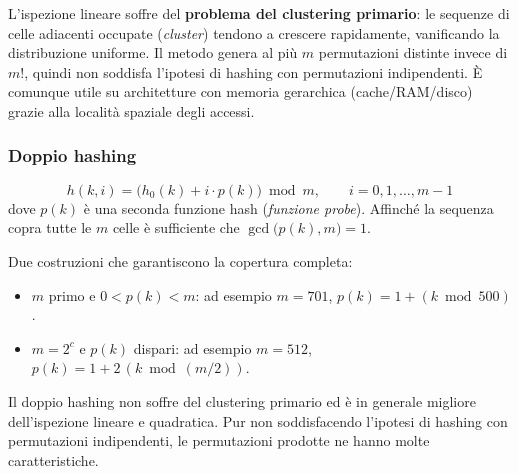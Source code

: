 \begin{hardnote}
	L'ispezione lineare soffre del \textbf{problema del clustering primario}:
	le sequenze di celle adiacenti occupate (\emph{cluster}) tendono a crescere
	rapidamente, vanificando la distribuzione uniforme. Il metodo genera al più
	$m$ permutazioni distinte invece di $m!$, quindi non soddisfa l'ipotesi di
	hashing con permutazioni indipendenti. È comunque utile su architetture con
	memoria gerarchica (cache/RAM/disco) grazie alla località spaziale degli
	accessi.
\end{hardnote}

\subsubsection{Doppio hashing}

\begin{definizione}
	\[
	h(k, i) = \bigl(h_0(k) + i \cdot p(k)\bigr) \bmod m,
	\qquad i = 0, 1, \ldots, m-1
	\]
	dove $p(k)$ è una seconda funzione hash (\emph{funzione probe}). Affinché
	la sequenza copra tutte le $m$ celle è sufficiente che
	$\gcd\bigl(p(k), m\bigr) = 1$.
\end{definizione}

\begin{nota}
	Due costruzioni che garantiscono la copertura completa:
	\begin{itemize}
		\item $m$ primo e $0 < p(k) < m$: ad esempio $m = 701$,
		$p(k) = 1 + (k \bmod 500)$.
		\item $m = 2^c$ e $p(k)$ dispari: ad esempio $m = 512$,
		$p(k) = 1 + 2\,(k \bmod (m/2))$.
	\end{itemize}
	Il doppio hashing non soffre del clustering primario ed è in generale
	migliore dell'ispezione lineare e quadratica. Pur non soddisfacendo
	l'ipotesi di hashing con permutazioni indipendenti, le permutazioni
	prodotte ne hanno molte caratteristiche.
\end{nota}